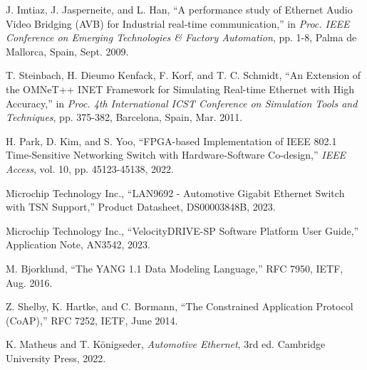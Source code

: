 \documentclass[10pt,twocolumn]{IEEEtran}
\begin{document}
\begin{thebibliography}{99}
J. Imtiaz, J. Jasperneite, and L. Han, ``A performance study of Ethernet Audio Video Bridging (AVB) for Industrial real-time communication,'' in \textit{Proc. IEEE Conference on Emerging Technologies \& Factory Automation}, pp. 1-8, Palma de Mallorca, Spain, Sept. 2009.

T. Steinbach, H. Dieumo Kenfack, F. Korf, and T. C. Schmidt, ``An Extension of the OMNeT++ INET Framework for Simulating Real-time Ethernet with High Accuracy,'' in \textit{Proc. 4th International ICST Conference on Simulation Tools and Techniques}, pp. 375-382, Barcelona, Spain, Mar. 2011.

H. Park, D. Kim, and S. Yoo, ``FPGA-based Implementation of IEEE 802.1 Time-Sensitive Networking Switch with Hardware-Software Co-design,'' \textit{IEEE Access}, vol. 10, pp. 45123-45138, 2022.

Microchip Technology Inc., ``LAN9692 - Automotive Gigabit Ethernet Switch with TSN Support,'' Product Datasheet, DS00003848B, 2023.

Microchip Technology Inc., ``VelocityDRIVE-SP Software Platform User Guide,'' Application Note, AN3542, 2023.

M. Bjorklund, ``The YANG 1.1 Data Modeling Language,'' RFC 7950, IETF, Aug. 2016.

Z. Shelby, K. Hartke, and C. Bormann, ``The Constrained Application Protocol (CoAP),'' RFC 7252, IETF, June 2014.

K. Matheus and T. Königseder, \textit{Automotive Ethernet}, 3rd ed. Cambridge University Press, 2022.

\end{thebibliography}
\end{document}

